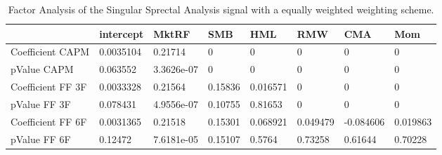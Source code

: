 \begin{table}[H]
\centering
\begin{tabular}{llllllll}
& intercept & MktRF & SMB & HML & RMW & CMA & Mom \\ 
\hline 
Coefficient CAPM & 0.0035104 & 0.21714 & 0 & 0 & 0 & 0 & 0 \\ 
pValue CAPM & 0.063552 & 3.3626e-07 & 0 & 0 & 0 & 0 & 0 \\ 
Coefficient FF 3F & 0.0033328 & 0.21564 & 0.15836 & 0.016571 & 0 & 0 & 0 \\ 
pValue FF 3F & 0.078431 & 4.9556e-07 & 0.10755 & 0.81653 & 0 & 0 & 0 \\ 
Coefficient FF 6F & 0.0031365 & 0.21518 & 0.15301 & 0.068921 & 0.049479 & -0.084606 & 0.019863 \\ 
pValue FF 6F & 0.12472 & 7.6181e-05 & 0.15107 & 0.5764 & 0.73258 & 0.61644 & 0.70228 \\ 
\hline
\end{tabular}
\caption{Factor Analysis of the Singular Sprectal Analysis signal with a equally weighted weighting scheme.}
\label{SSA_EW_FACTOR}
\end{table}